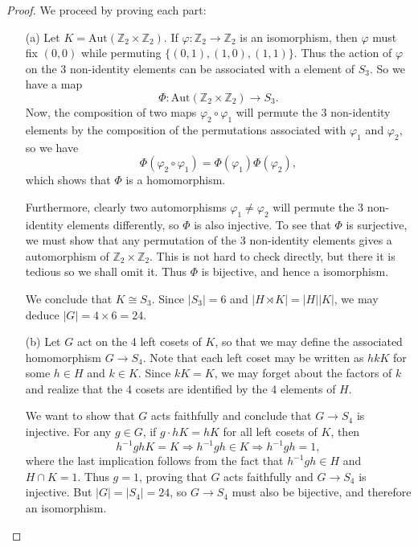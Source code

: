 \documentclass[12pt]{article}
\theoremstyle{remark}
\theoremstyle{named}
\renewcommand{\implies}{\Rightarrow}
\newcommand{\Aut}{\text{Aut}}
\begin{document}
\begin{proof}
    We proceed by proving each part:
    \begin{enumerate}
        \item[(a)] Let \(K = \Aut(\mathbb Z_2 \times \mathbb Z_2)\). If \(\varphi : \mathbb Z_2 \to \mathbb Z_2\) is an isomorphism, then \(\varphi\) must fix \((0, 0)\) while permuting \(\{(0, 1), (1, 0), (1, 1)\}\). Thus the action of \(\varphi\) on the 3 non-identity elements can be associated with a element of \(S_3\). So we have a map
        \[\Phi : \Aut(\mathbb Z_2 \times \mathbb Z_2) \to S_3.\] 
        Now, the composition of two maps \(\varphi_2 \circ \varphi_1\) will permute the 3 non-identity elements by the composition of the permutations associated with \(\varphi_1\) and \(\varphi_2\), so we have \[\Phi(\varphi_2 \circ \varphi_1) = \Phi(\varphi_1) \Phi(\varphi_2),\]
        which shows that \(\Phi\) is a homomorphism. 
        
        Furthermore, clearly two automorphisms \(\varphi_1 \neq \varphi_2\) will permute the 3 non-identity elements differently, so \(\Phi\) is also injective. 
        To see that \(\Phi\) is surjective, we must show that any permutation of the 3 non-identity elements gives a automorphism of \(\mathbb Z_2 \times \mathbb Z_2\). This is not hard to check directly, but there it is tedious so we shall omit it. 
        Thus \(\Phi\) is bijective, and hence a isomorphism. 
        
        We conclude that \(K \cong S_3\). Since \(|S_3| = 6\) and \(|H \rtimes K| = |H||K|\), we may deduce \(|G| = 4 \times 6 = 24\).

        \item[(b)] Let \(G\) act on the 4 left cosets of \(K\), so that we may define the associated homomorphism \(G \to S_4\). Note that each left coset may be written as \(hk K\) for some \(h \in H\) and \(k \in K\). Since \(kK = K\), we may forget about the factors of \(k\) and realize that the 4 cosets are identified by the 4 elements of \(H\). 
        
        We want to show that \(G\) acts faithfully and conclude that \(G \to S_4\) is injective. For any \(g \in G\), if \(g \cdot hK = hK\) for all left cosets of \(K\), then 
        \[h^{-1}gh K = K \implies h^{-1}gh \in K \implies h^{-1}gh = 1,\]
        where the last implication follows from the fact that \(h^{-1}gh \in H\) and \(H \cap K = 1\). Thus \(g = 1\), proving that \(G\) acts faithfully and \(G \to S_4\) is injective. But \(|G| = |S_4| = 24\), so \(G \to S_4\) must also be bijective, and therefore an isomorphism.
    \end{enumerate}
\end{proof}
\end{document}
